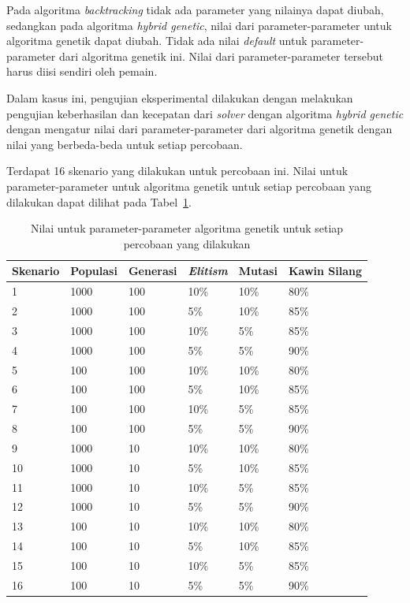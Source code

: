 Pada algoritma \textit{backtracking} tidak ada parameter yang nilainya dapat diubah, sedangkan pada algoritma \textit{hybrid genetic}, nilai dari parameter-parameter untuk algoritma genetik dapat diubah. Tidak ada nilai \textit{default} untuk parameter-parameter dari algoritma genetik ini. Nilai dari parameter-parameter tersebut harus diisi sendiri oleh pemain.

Dalam kasus ini, pengujian eksperimental dilakukan dengan melakukan pengujian keberhasilan dan kecepatan dari \textit{solver} dengan algoritma \textit{hybrid genetic} dengan mengatur nilai dari parameter-parameter dari algoritma genetik dengan nilai yang berbeda-beda untuk setiap percobaan.

Terdapat 16 skenario yang dilakukan untuk percobaan ini. Nilai untuk parameter-parameter untuk algoritma genetik untuk setiap percobaan yang dilakukan dapat dilihat pada Tabel~\ref{tab:nilaiparameterhg}.

\begin{table}
\centering
\captionsetup{justification=centering}
\caption[Nilai untuk parameter-parameter algoritma genetik untuk setiap percobaan yang dilakukan]{Nilai untuk parameter-parameter algoritma genetik untuk setiap percobaan yang dilakukan}
\begin{tabular}{| l | l | l | l | l | l |}
\hline
Skenario & Populasi & Generasi & \textit{Elitism} & Mutasi & Kawin Silang \\
\hline \hline
1 & 1000 & 100 & 10\% & 10\% & 80\% \\
\hline
2 & 1000 & 100 & 5\% & 10\% & 85\% \\
\hline
3 & 1000 & 100 & 10\% & 5\% & 85\% \\
\hline
4 & 1000 & 100 & 5\% & 5\% & 90\% \\
\hline
5 & 100 & 100 & 10\% & 10\% & 80\% \\
\hline
6 & 100 & 100 & 5\% & 10\% & 85\% \\
\hline
7 & 100 & 100 & 10\% & 5\% & 85\% \\
\hline
8 & 100 & 100 & 5\% & 5\% & 90\% \\
\hline
9 & 1000 & 10 & 10\% & 10\% & 80\% \\
\hline
10 & 1000 & 10 & 5\% & 10\% & 85\% \\
\hline
11 & 1000 & 10 & 10\% & 5\% & 85\% \\
\hline
12 & 1000 & 10 & 5\% & 5\% & 90\% \\
\hline
13 & 100 & 10 & 10\% & 10\% & 80\% \\
\hline
14 & 100 & 10 & 5\% & 10\% & 85\% \\
\hline
15 & 100 & 10 & 10\% & 5\% & 85\% \\
\hline
16 & 100 & 10 & 5\% & 5\% & 90\% \\
\hline
\end{tabular}
\label{tab:nilaiparameterhg}
\end{table}

